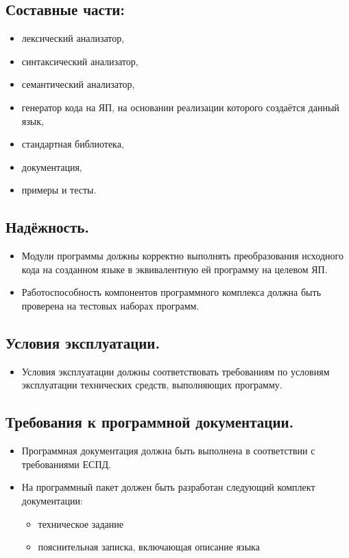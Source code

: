 \documentclass[12pt,a4paper,oneside]{extarticle}
\begin{document}
    \subsection{Составные части:}
        \begin{itemize}
            \item лексический анализатор,
            \item синтаксический анализатор,
            \item семантический анализатор,
            \item генератор кода на ЯП, на основании реализации которого создаётся данный язык,
            \item стандартная библиотека,
            \item документация,
            \item примеры и тесты.
        \end{itemize}
    \subsection{Надёжность.}
        \begin{itemize}
            \item Модули программы должны корректно выполнять преобразования исходного кода на созданном языке в эквивалентную ей программу на целевом ЯП.
            \item Работоспособность компонентов программного комплекса должна быть проверена на тестовых наборах программ.
        \end{itemize}
    \subsection{Условия эксплуатации.}
        \begin{itemize}
            \item Условия эксплуатации должны соответствовать требованиям по условиям эксплуатации технических средств, выполняющих программу.
        \end{itemize}
    \subsection{Требования к программной документации.}
        \begin{itemize}
            \item Программная документация должна быть выполнена в соответствии с требованиями ЕСПД.
            \item На программный пакет должен быть разработан следующий комплект документации:
                \begin{itemize}
                    \item техническое задание
                    \item пояснительная записка, включающая описание языка
                \end{itemize}
        \end{itemize}
\end{document}
